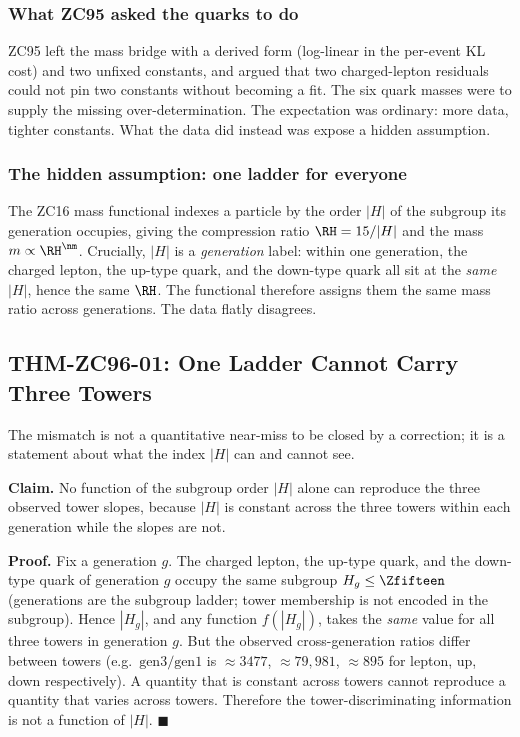 \documentclass[12pt, a4paper]{article}
\begin{document}
\subsubsection{What ZC95 asked the quarks to do}

ZC95 left the mass bridge with a derived form (log-linear in the per-event KL
cost) and two unfixed constants, and argued that two charged-lepton residuals
could not pin two constants without becoming a fit. The six quark masses were to
supply the missing over-determination. The expectation was ordinary: more data,
tighter constants. What the data did instead was expose a hidden assumption.

\subsubsection{The hidden assumption: one ladder for everyone}

The ZC16 mass functional indexes a particle by the order $|H|$ of the subgroup
its generation occupies, giving the compression ratio $\RH=15/|H|$ and the
mass $m\propto\RH^{\nm}$. Crucially, $|H|$ is a \emph{generation} label: within
one generation, the charged lepton, the up-type quark, and the down-type quark
all sit at the \emph{same} $|H|$, hence the same $\RH$. The functional therefore
assigns them the same mass ratio across generations. The data flatly disagrees.

\subsection{THM-ZC96-01: One Ladder Cannot Carry Three Towers}
\label{sec:insufficiency-zc96}

The mismatch is not a quantitative near-miss to be closed by a correction; it is
a statement about what the index $|H|$ can and cannot see.

\begin{formalbox}[title={THM-ZC96-01: Single-Ladder Insufficiency (structural)}]
\textbf{Claim.} No function of the subgroup order $|H|$ alone can reproduce the
three observed tower slopes, because $|H|$ is constant across the three towers
within each generation while the slopes are not.

\textbf{Proof.} Fix a generation $g$. The charged lepton, the up-type quark, and
the down-type quark of generation $g$ occupy the same subgroup $H_g\le\Zfifteen$
(generations are the subgroup ladder; tower membership is not encoded in the
subgroup). Hence $|H_g|$, and any function $f(|H_g|)$, takes the \emph{same}
value for all three towers in generation $g$. But the observed cross-generation
ratios differ between towers (e.g.\ $\text{gen3/gen1}$ is $\approx 3477$,
$\approx 79{,}981$, $\approx 895$ for lepton, up, down respectively). A quantity
that is constant across towers cannot reproduce a quantity that varies across
towers. Therefore the tower-discriminating information is not a function of
$|H|$. \hfill$\blacksquare$
\end{formalbox}
\end{document}
